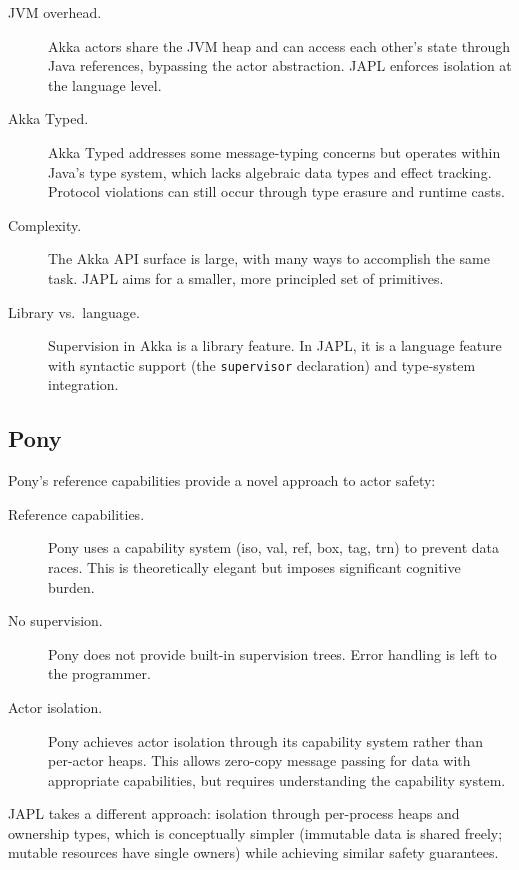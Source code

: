 \documentclass[11pt,a4paper]{article}
\begin{document}
\begin{description}
\item[JVM overhead.] Akka actors share the JVM heap and can access each other's state through Java references, bypassing the actor abstraction. JAPL enforces isolation at the language level.

\item[Akka Typed.] Akka Typed addresses some message-typing concerns but operates within Java's type system, which lacks algebraic data types and effect tracking. Protocol violations can still occur through type erasure and runtime casts.

\item[Complexity.] The Akka API surface is large, with many ways to accomplish the same task. JAPL aims for a smaller, more principled set of primitives.

\item[Library vs.\ language.] Supervision in Akka is a library feature. In JAPL, it is a language feature with syntactic support (the \texttt{supervisor} declaration) and type-system integration.
\end{description}

\subsection{Pony}

Pony's reference capabilities provide a novel approach to actor safety:

\begin{description}
\item[Reference capabilities.] Pony uses a capability system (iso, val, ref, box, tag, trn) to prevent data races. This is theoretically elegant but imposes significant cognitive burden.

\item[No supervision.] Pony does not provide built-in supervision trees. Error handling is left to the programmer.

\item[Actor isolation.] Pony achieves actor isolation through its capability system rather than per-actor heaps. This allows zero-copy message passing for data with appropriate capabilities, but requires understanding the capability system.
\end{description}

JAPL takes a different approach: isolation through per-process heaps and ownership types, which is conceptually simpler (immutable data is shared freely; mutable resources have single owners) while achieving similar safety guarantees.
\end{document}
